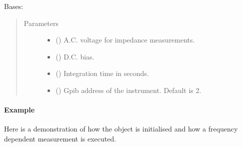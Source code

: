 \documentclass[letterpaper,10pt,english]{sphinxmanual}
\begin{document}
\begin{fulllineitems}
\label{\detokenize{vtipy_docs/vtipy:vtipy.impedance.solartron1260}}
Bases: 
\begin{quote}\begin{description}
\item[{Parameters}] \leavevmode\begin{itemize}
\item {} 
 (\sphinxstyleliteralemphasis{\sphinxupquote{, }}) \textendash{} A.C. voltage for impedance measurements.

\item {} 
 (\sphinxstyleliteralemphasis{\sphinxupquote{, }}) \textendash{} D.C. bias.

\item {} 
 (\sphinxstyleliteralemphasis{\sphinxupquote{, }}) \textendash{} Integration time in seconds.

\item {} 
 (\sphinxstyleliteralemphasis{\sphinxupquote{, }}\sphinxstyleliteralemphasis{\sphinxupquote{,}}) \textendash{} Gpib address of the instrument. Default is 2.

\end{itemize}

\end{description}\end{quote}
\paragraph{Example}

Here is a demonstration of how the object is initialised
and how a frequency dependent measurement is executed.


\end{fulllineitems}
\end{document}
